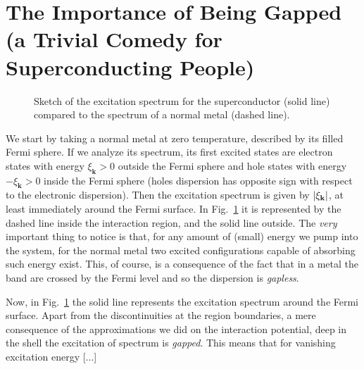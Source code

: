 \section{The Importance of Being Gapped \newline \small (a Trivial Comedy for Superconducting People)}

\begin{figure}
	\centering
	
	\caption{Sketch of the excitation spectrum for the superconductor (solid line) compared to the spectrum of a normal metal (dashed line).}
\label{fig:excitation spectrum}
\end{figure}

We start by taking a normal metal at zero temperature, described by its filled Fermi sphere. If we analyze its spectrum, its first excited states are electron states with energy $\xi_\mathbf{k} > 0$ outside the Fermi sphere and hole states with energy $-\xi_\mathbf{k} > 0$ inside the Fermi sphere (holes dispersion has opposite sign with respect to the electronic dispersion). Then the excitation spectrum is given by $\abs{\xi_\mathbf{k}}$, at least immediately around the Fermi surface. In Fig.~\ref{fig:excitation spectrum} it is represented by the dashed line inside the interaction region, and the solid line outside. The \textit{very} important thing to notice is that, for any amount of (small) energy we pump into the system, for the normal metal two excited configurations capable of absorbing such energy exist. This, of course, is a consequence of the fact that in a metal the band are crossed by the Fermi level and so the dispersion is \textit{gapless}.

Now, in Fig.~\ref{fig:excitation spectrum} the solid line represents the excitation spectrum around the Fermi surface. Apart from the discontinuities at the region boundaries, a mere consequence of the approximations we did on the interaction potential, deep in the shell the excitation of spectrum is \textit{gapped}. This means that for vanishing excitation energy [...]